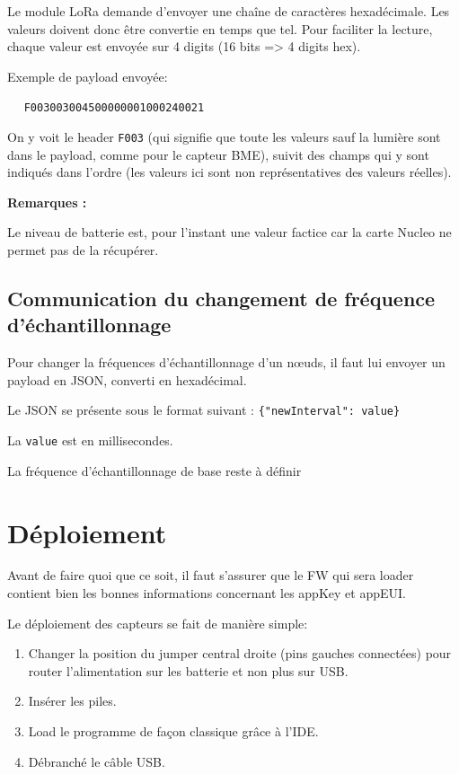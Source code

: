 Le module LoRa demande d'envoyer une chaîne de caractères hexadécimale. Les valeurs doivent donc être convertie en temps que tel. Pour faciliter la lecture, chaque valeur est envoyée sur 4 digits (16 bits => 4 digits hex).

Exemple de payload envoyée:

\hspace{1cm}\textbullet~~ \texttt{F003003004500000001000240021}

On y voit le header \texttt{F003} (qui signifie que toute les valeurs sauf la lumière sont dans le payload, comme pour le capteur BME), suivit des champs qui y sont indiqués dans l'ordre (les valeurs ici sont non représentatives des valeurs réelles).
\vspace{5mm}

\textbf{Remarques :}

Le niveau de batterie est, pour l'instant une valeur factice car la carte Nucleo ne permet pas de la récupérer.

\clearpage
\subsection{Communication du changement de fréquence d'échantillonnage}

Pour changer la fréquences d'échantillonnage d'un nœuds, il faut lui envoyer un payload en JSON, converti en hexadécimal.

Le JSON se présente sous le format suivant : \texttt{\{"newInterval": value\}}

La \texttt{value} est en millisecondes.

La fréquence d'échantillonnage de base reste à définir

\section{Déploiement}

Avant de faire quoi que ce soit, il faut s'assurer que le FW qui sera loader contient bien les bonnes informations concernant les appKey et appEUI.

Le déploiement des capteurs se fait de manière simple:

\begin{enumerate}
\item Changer la position du jumper central droite (pins gauches connectées) pour router l'alimentation sur les batterie et non plus sur USB.
\item Insérer les piles.
\item Load le programme de façon classique grâce à l'IDE.
\item Débranché le câble USB.
\end{enumerate}
\vspace{5mm}

